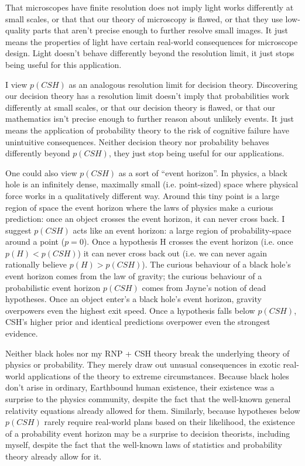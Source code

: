 \documentclass{article}
\begin{document}
That microscopes have finite resolution does not imply light works differently at small scales, or that that our theory of microscopy is flawed, or that they use low-quality parts that aren't precise enough to further resolve small images. It just means the properties of light have certain real-world consequences for microscope design. Light doesn't behave differently beyond the resolution limit, it just stops being useful for this application.

I view \(p(CSH)\) as an analogous resolution limit for decision theory. Discovering our decision theory has a resolution limit doesn't imply that probabilities work differently at small scales, or that our decision theory is flawed, or that our mathematics isn't precise enough to further reason about unlikely events. It just means the application of probability theory to the risk of cognitive failure have unintuitive consequences. Neither decision theory nor probability behaves differently beyond \(p(CSH)\), they just stop being useful for our applications. 

One could also view \(p(CSH)\) as a sort of ``event horizon''. In physics, a black hole is an infinitely dense, maximally small (i.e. point-sized) space where physical force works in a qualitatively different way. Around this tiny point is a large region of space \textemdash{} the event horizon \textemdash{} where the laws of physics make a curious prediction: once an object crosses the event horizon, it can never cross back. I suggest \(p(CSH)\) acts like an event horizon: a large region of probability-space around a point (\(p=0\)). Once a hypothesis H crosses the event horizon (i.e. once \(p(H)<p(CSH)\)) it can never cross back out (i.e. we can never again rationally believe \(p(H)>p(CSH)\)). The curious behaviour of a black hole's event horizon comes from the law of gravity; the curious behaviour of a probabilistic event horizon \(p(CSH)\) comes from Jayne's notion of dead hypotheses. Once an object enter's a black hole's event horizon, gravity overpowers even the highest exit speed. Once a hypothesis falls below \(p(CSH)\), CSH's higher prior and identical predictions overpower even the strongest evidence. 

Neither black holes nor my RNP + CSH theory break the underlying theory of physics or probability. They merely draw out unusual consequences in exotic real-world applications of the theory to extreme circumstances. Because black holes don't arise in ordinary, Earthbound human existence, their existence was a surprise to the physics community, despite the fact that the well-known general relativity equations already allowed for them. Similarly, because hypotheses below \(p(CSH)\) rarely require real-world plans based on their likelihood, the existence of a probability event horizon may be a surprise to decision theorists, including myself, despite the fact that the well-known laws of statistics and probability theory already allow for it.
\end{document}
